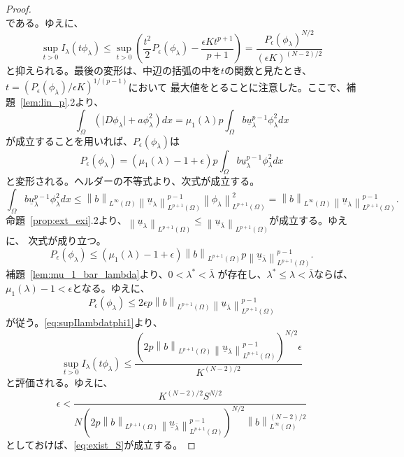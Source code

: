 \begin{proof}
\[ \]
 である。ゆえに、
\begin{equation}
 \sup_{t > 0} I_\lambda (t \phi_\lambda) \leq \sup_{t > 0} \left(
                                                            \frac{t^2}{2} P_\epsilon 
 (\phi_\lambda) - \frac{\epsilon K t^{p+1}}{p+1} \right) =  
 \frac{P_\epsilon(\phi_\lambda)^{N/2}}{\left( \epsilon K
                                         \right)^{(N-2)/2}}
 \label{eq:supIlambdatphi1} 
\end{equation}
と抑えられる。最後の変形は、中辺の括弧の中を$t$の関数と見たとき、
$t = ( P_\epsilon(\phi_\lambda) / \epsilon K )^{1/(p-1)}$において
最大値をとることに注意した。ここで、補題~\ref{lem:lin_p}.2より、
\[
 \int_\Omega \left( \lvert D\phi_\lambda \rvert + a \phi_\lambda^2
 \right) dx = \mu_1(\lambda) p \int_\Omega b
 \underline{u}_\lambda^{p-1} \phi_\lambda^2 dx
\]
が成立することを用いれば、$P_\epsilon(\phi_\lambda)$は
\[
 P_\epsilon(\phi_\lambda) = \left( \mu_1(\lambda) - 1 + \epsilon
 \right) p \int_\Omega b \underline{u}_\lambda^{p-1} \phi_\lambda^2 dx
\]
と変形される。ヘルダーの不等式より、次式が成立する。
\[
 \int_\Omega b \underline{u}_\lambda^{p-1} \phi_\lambda^2 dx \leq
 \left\| b \right\|_{L^\infty(\Omega)} \left\| \underline{u}_\lambda
 \right\|_{L^{p+1}(\Omega)}^{p-1} \left\| \phi_\lambda
 \right\|_{L^{p+1}(\Omega)}^2 = \left\| b \right\|_{L^\infty(\Omega)}
 \left\| \underline{u}_\lambda 
 \right\|_{L^{p+1}(\Omega)}^{p-1}.
\]
命題~\ref{prop:ext_exi}.2より、$\left\| \underline{u}_\lambda 
 \right\|_{L^{p+1}(\Omega)} \leq \left\| \underline{u}_{\bar{\lambda}} 
 \right\|_{L^{p+1}(\Omega)}$が成立する。ゆえに、
次式が成り立つ。
\[
 P_\epsilon(\phi_\lambda) \leq (\mu_1(\lambda) - 1 + \epsilon) \left\|
 b \right\|_{L^{p+1}(\Omega)} p \left\| \underline{u}_{\bar{\lambda}}
 \right\|_{L^{p+1}(\Omega)}^{p-1}.
\]
補題~\ref{lem:mu_1_bar_lambda}より、$0 < \lambda^{*} < \bar{\lambda}$
が存在し、$\lambda^{*} \leq \lambda < \bar{\lambda}$ならば、
$\mu_1(\lambda) - 1 < \epsilon$となる。ゆえに、
\[
 P_\epsilon(\phi_\lambda) \leq 2\epsilon p \left\|
 b \right\|_{L^{p+1}(\Omega)} \left\| \underline{u}_{\bar{\lambda}}
 \right\|_{L^{p+1}(\Omega)}^{p-1}
\]
が従う。\eqref{eq:supIlambdatphi1}より、
\[
 \sup_{t > 0} I_\lambda (t \phi_\lambda) \leq \frac{\left( 2p \left\|
 b \right\|_{L^{p+1}(\Omega)} \left\| \underline{u}_{\bar{\lambda}}
 \right\|_{L^{p+1}(\Omega)}^{p-1} \right)^{N/2} \epsilon}{K^{(N-2)/2}}
\]
と評価される。ゆえに、
\begin{equation}
 \epsilon < \frac{K^{(N-2)/2} S^{N/2}}{N
 \left( 2p \left\|
  b \right\|_{L^{p+1}(\Omega)} \left\| \underline{u}_{\bar{\lambda}}
 \right\|_{L^{p+1}(\Omega)}^{p-1} \right)^{N/2}
  \left\| b
  \right\|_{L^\infty(\Omega)} ^{(N-2)/2}}
 \label{eq:epsilon_gutaiteki}
\end{equation}
としておけば、\eqref{eq:exist_S}が成立する。 \qedhere
\end{proof}


